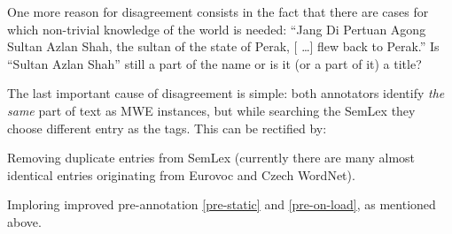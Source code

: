 One more reason for disagreement consists in the fact that there are cases for which non-trivial knowledge of the world is needed: ``Jang Di Pertuan Agong Sultan Azlan Shah, the sultan of the state of Perak, [\kern 2pt \ldots] flew back to Perak.'' Is ``Sultan Azlan Shah'' still a part of the name or is it (or a part of it) a title?

The last important cause of disagreement is simple: both annotators identify {\em the same} part of text as MWE instances, but while searching the SemLex they choose different entry as the tags. This can be rectified by:
	\begin{compactitem}
		\item Removing duplicate entries from SemLex (currently there are many almost identical entries originating from Eurovoc and Czech WordNet).
		\item Imploring improved pre-annotation \ref{pre-static} and \ref{pre-on-load}, as mentioned above.
	\end{compactitem}



